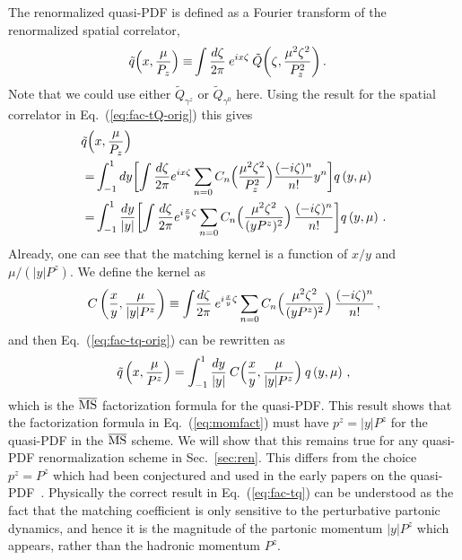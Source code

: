 \documentclass[prd,aps,twocolumn,preprintnumbers,showpacs,nofootinbib,superscriptaddress,notitlepage]{revtex4-1}
\newcommand{\nn}{\nonumber}
\newcommand{\spcorr}{spatial correlator\xspace}
\DeclareRobustCommand{\eq}[1]{Eq.~(\ref{eq:#1})}
\DeclareRobustCommand{\sec}[1]{Sec.~\ref{sec:#1}}
\begin{document}
The renormalized quasi-PDF is defined as a Fourier transform of the renormalized \spcorr,
\begin{align} \label{eq:fac-tq-orig0}
\tilde{q} \Bigl(  x, \frac{\mu}{P_z}\Bigr)
\equiv &\int \frac{d \zeta}{2 \pi}\: e^{ix \zeta}\:  \tilde{Q} \biggl(\zeta, \frac{{\mu}^2\zeta^2}{P_z^2}\biggr) \,.
\end{align}
Note that we could use either $\tilde{Q}_{\gamma^z}$ or $\tilde{Q}_{\gamma^0}$ here.
Using the result for the \spcorr in Eq.~(\ref{eq:fac-tQ-orig}) this gives
\begin{align} \label{eq:fac-tq-orig}
\tilde{q} \Bigl( & x, \frac{\mu}{P_z}\Bigr)
 \\
= &  \int_{-1}^1 dy \biggl[ \int \frac{d \zeta}{2 \pi} e^{ix \zeta}
\sum_{n=0} C_n \Bigl( \frac{{\mu}^2\zeta^2}{P_z^2}\Bigr)  \frac{(-i
	\zeta)^n}{n!} y^n \biggr] q \left( y, \mu \right)
\nn\\
= &  \int_{-1}^1 {dy\over |y|} \biggl[\int \frac{d \zeta}{2 \pi} e^{i
	\frac{x}{y} \zeta}  \sum_{n=0} C_n \Bigl( \frac{{\mu}^2\zeta^2 }{(yP^z)^2}\Bigr)\,  \frac{(-i \zeta)^n}{n!}  \biggr] q \left( y,\mu \right) \,.
  \nn
\end{align}
Already, one can see that the matching kernel is a function of $x / y$
and $\mu / (|y|P^z)$. We define the kernel as
\begin{align}   \label{eq:fac-c}
C \left( {x\over y}, \frac{\mu}{|y|P^z} \right)
   \equiv \int\! \frac{d \zeta}{2 \pi} \: e^{i {x\over y} \zeta}
   \sum_{n=0} C_n \Bigl(
\frac{{\mu}^2\zeta^2}{(yP^z)^2}\Bigr) \, \frac{(-i \zeta)^n}{n!}
 \,,
\end{align}
and then Eq.~(\ref{eq:fac-tq-orig}) can be rewritten as
\begin{align} \label{eq:fac-tq}
\tilde{q} \left( x, \frac{\mu}{P^z}\right)
  = \int_{-1}^1 \frac{dy}{|y|}\: C \Bigl(
   \frac{x}{y}, \frac{\mu}{|y|P^z} \Bigr)\: q \left( y,\mu\right)
   \,,
\end{align}
which is the $\overline{\rm MS}$ factorization formula for the quasi-PDF. This result shows that the factorization formula in Eq.~(\ref{eq:momfact}) must have $p^z=|y|P^z$ for the quasi-PDF in the $\overline{\rm MS}$ scheme. We will show that this remains true for any quasi-PDF renormalization scheme in \sec{ren}. This differs
from the choice $p^z=P^z$ which had been conjectured and used in the early papers on the quasi-PDF~\cite{Ji:2013dva,Ji:2014gla,Xiong:2013bka}. Physically the correct result in \eq{fac-tq} can be understood as the fact that the matching coefficient is only sensitive to the perturbative partonic dynamics, and hence it is the magnitude of the partonic momentum $|y| P^z$ which appears, rather than the hadronic momentum $P^z$.
\end{document}
